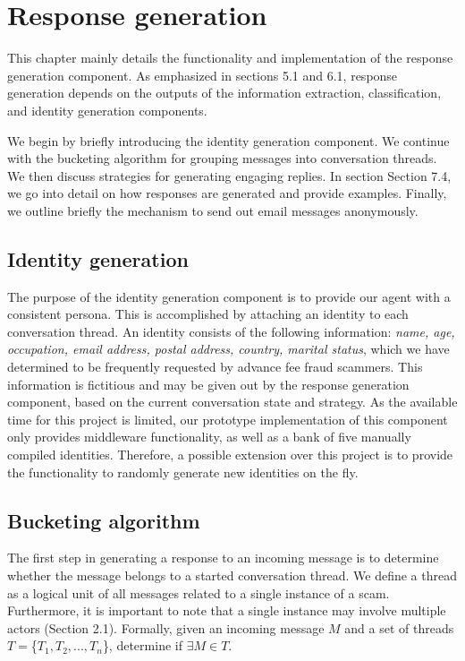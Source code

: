 \chapter{Response generation}

This chapter mainly details the functionality and implementation of the response generation component. As emphasized in sections 5.1 and 6.1, response generation depends on the outputs of the information extraction, classification, and identity generation components. 

We begin by briefly introducing the identity generation component. We continue with the bucketing algorithm for grouping messages into conversation threads. We then discuss strategies for generating engaging replies. In section Section 7.4, we go into detail on how responses are generated and provide examples. Finally, we outline briefly the mechanism to send out email messages anonymously.

\section{Identity generation}
The purpose of the identity generation component is to provide our agent with a consistent persona. This is accomplished by attaching an identity to each conversation thread. An identity consists of the following information: \textit{name, age, occupation, email address, postal address, country, marital status}, which we have determined to be frequently requested by advance fee fraud scammers. This information is fictitious and may be given out by the response generation component, based on the current conversation state and strategy. As the available time for this project is limited, our prototype implementation of this component only provides middleware functionality, as well as a bank of five manually compiled identities. Therefore, a possible extension over this project is to provide the functionality to randomly generate new identities on the fly.

\section{Bucketing algorithm}
The first step in generating a response to an incoming message is to determine whether the message belongs to a started conversation thread. We define a thread as a logical unit of all messages related to a single instance of a scam. Furthermore, it is important to note that a single instance may involve multiple actors (Section 2.1). Formally, given an incoming message $M$ and a set of threads $T = $\{$T_{1}, T_{2}, ..., T_{n}$\}, determine if $\exists M \in T$.
	
